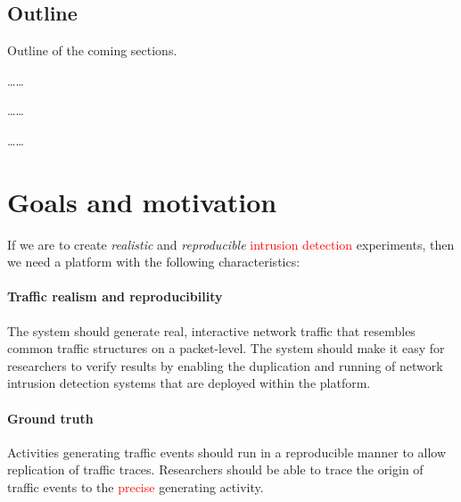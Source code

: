 \documentclass{article}
\begin{document}
\subsection{Outline}


Outline of the coming sections.

\dots \dots

\dots \dots

\dots \dots

\section{Goals and motivation}

If we are to create \textit{realistic} and \textit{reproducible} \textcolor{red}{intrusion detection} experiments, then we need a platform with the following characteristics:

\paragraph{Traffic realism and reproducibility} The system should generate real, interactive network traffic that resembles common traffic structures on a packet-level. The system should make it easy for researchers to verify results by enabling the duplication and running of network intrusion detection systems that are deployed within the platform.   

\paragraph{Ground truth} Activities generating traffic events should run in a reproducible manner to allow replication of traffic traces. Researchers should be able to trace the origin of traffic events to the \textcolor{red}{precise} generating activity.
\end{document}
